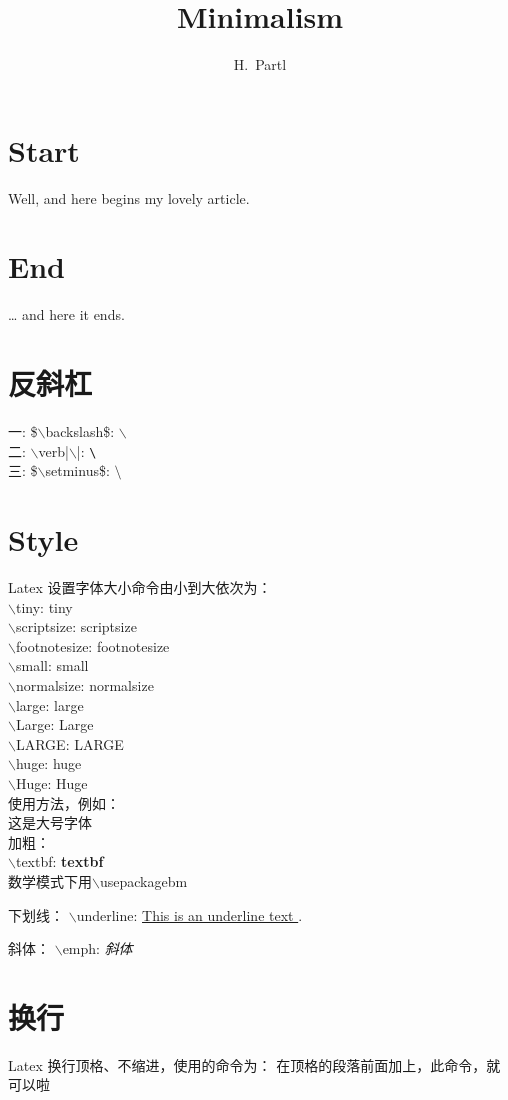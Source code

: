 \documentclass[a4paper,11pt]{ctexart}
\author{H.~Partl}
\title{Minimalism}
\begin{document}
\maketitle
\tableofcontents
\section{Start}
Well, and here begins my lovely article.
\section{End}
\ldots{} and here it ends.
\section{反斜杠}
一: \$$\backslash$backslash\$: $\backslash$ \\
二: $\backslash$verb|$\backslash$|: \verb|\| \\
三: \$$\backslash$setminus\$: $\setminus$ \\
\section{Style}
Latex 设置字体大小命令由小到大依次为： \\
$\backslash$tiny: \tiny{tiny} \\
$\backslash$scriptsize: \scriptsize{scriptsize} \\
$\backslash$footnotesize: \footnotesize{footnotesize} \\
$\backslash$small: \small{small} \\
$\backslash$normalsize: \normalsize{normalsize} \\
$\backslash$large: \large{large} \\
$\backslash$Large: \Large{Large} \\
$\backslash$LARGE: \LARGE{LARGE} \\
$\backslash$huge: \huge{huge} \\
$\backslash$Huge: \Huge{Huge} \\

使用方法，例如： \\
\large{这是大号字体} \\
 
 加粗： \\
$\backslash$textbf: \textbf{textbf} \\

数学模式下用$\backslash$usepackage{bm}
 
下划线：
$\backslash$underline: \underline{ This is an underline text }.
 
斜体：
$\backslash$emph: \emph{斜体}

\section{换行}
Latex 换行顶格、不缩进，使用的命令为：
\noindent
在顶格的段落前面加上，此命令，就可以啦~~~
\end{document}
